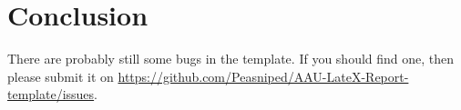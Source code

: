 \chapter{Conclusion}\label{ch:conclusion}
There are probably still some bugs in the template. If you should find one, then please submit it on \url{https://github.com/Peasniped/AAU-LateX-Report-template/issues}.
